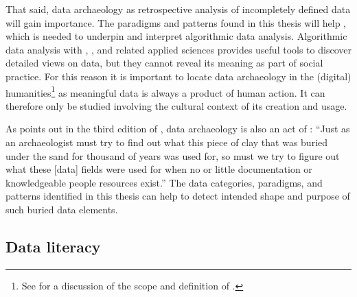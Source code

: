 That said, data archaeology as retrospective analysis of incompletely defined
data will gain importance. The paradigms and patterns found in this thesis will
help , which is needed to underpin and
interpret algorithmic data analysis.  Algorithmic data analysis with
, , and related applied sciences
provides useful tools to discover detailed views on data, but they cannot
reveal its meaning as part of social practice. For this reason it is important
to locate data archaeology in the (digital) humanities\footnote{See
\textcite{Svensson2010} for a discussion of the scope and definition of
.} as meaningful data is always a product of human
action.  It can therefore only be studied involving the cultural context of its
creation and usage. 

As  points out in the third edition of \textcite[p.
63]{Kent2012}, data archaeology is also an act of :
``Just as an archaeologist must try to find out what this piece of clay that was
buried under the sand for thousand of years was used for, so must we try to
figure out what these [data] fields were used for when no or little
documentation or knowledgeable people resources exist.'' The data categories,
paradigms, and patterns identified in this thesis can help to detect intended
shape and purpose of such buried data elements.


\subsection{Data literacy}
\label{sec:datalit}

